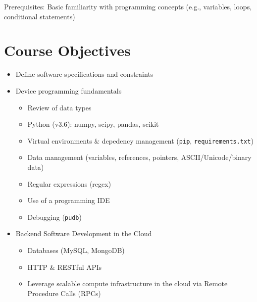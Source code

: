 Prerequisites: Basic familiarity with programming concepts (e.g., variables,
loops, conditional statements)

\section*{Course Objectives}
\begin{multicols}{2}
\begin{itemize}
    \item Define software specifications and constraints
    \item Device programming fundamentals
    \begin{itemize}
        \item Review of data types
        \item Python (v3.6): numpy, scipy, pandas, scikit
        \item Virtual environments \& depedency management (\verb+pip+, \verb+requirements.txt+)
        \item Data management (variables, references, pointers, ASCII/Unicode/binary data)
        \item Regular expressions (regex)
        \item Use of a programming IDE
        \item Debugging (\verb+pudb+)
    \end{itemize}
    \item Backend Software Development in the Cloud
    \begin{itemize}
        \item Databases (MySQL, MongoDB)
        \item HTTP \& RESTful APIs
        \item Leverage scalable compute infrastructure in the cloud via Remote Procedure Calls (RPCs)

\end{itemize}
\end{itemize}
\end{multicols}
